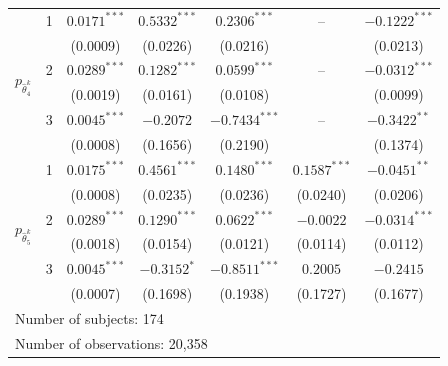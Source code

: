 \documentclass[11pt,a4paper]{article}
\theoremstyle{definition}
\begin{document}
\begin{table}[!ht]
\begin{threeparttable}
\begin{footnotesize}
{\begin{tabular}{@{}llccccc@{}}
                   & 1      & $0.0171^{***}$             & $0.5332^{***}$ & $0.2306^{***}$  & --             & $-0.1222^{***}$ \\
                   &           & (0.0009)                       & (0.0226)       & (0.0216)        &                & (0.0213)        \\
\multirow{2}{*}{$p_{\hat{\theta}_{4}^k}$} & 2      & $0.0289^{***}$               & $0.1282^{***}$ & $0.0599^{***}$  & --             & $-0.0312^{***}$ \\
                   &         & (0.0019)                       & (0.0161)       & (0.0108)        &                & (0.0099)        \\
                   & 3      & $0.0045^{***}$              & $-0.2072$      & $-0.7434^{***}$ & --             & $-0.3422^{**}$  \\
                   &         & (0.0008)                       & (0.1656)       & (0.2190)        &                & (0.1374)        \\ \midrule
                   & 1      & $0.0175^{***}$               & $0.4561^{***}$ & $0.1480^{***}$  & $0.1587^{***}$      & $-0.0451^{**}$  \\
                   &            & (0.0008)                       & (0.0235)       & (0.0236)        & (0.0240)       & (0.0206)        \\
\multirow{2}{*}{$p_{\hat{\theta}_{5}^k}$} & 2       & $0.0289^{***}$               & $0.1290^{***}$ & $0.0622^{***}$  & $-0.0022$      & $-0.0314^{***}$  \\
                   &              & (0.0018)                       & (0.0154)       & (0.0121)        & (0.0114)       & (0.0112)        \\
                   & 3      & $0.0045^{***}$              & $-0.3152^{*}$      & $-0.8511^{***}$  & $0.2005$       & $-0.2415$       \\
                   &            & (0.0007)                       & (0.1698)       & (0.1938)        & (0.1727)       & (0.1677)        \\ \midrule
\multicolumn{7}{l}{Number of subjects: 174}                                                                                                            \\
\multicolumn{7}{l}{Number of observations: 20,358}                                                                                                     \\ \bottomrule\bottomrule
\end{tabular}}

\end{footnotesize}
\end{threeparttable}
\end{table}
\end{document}
